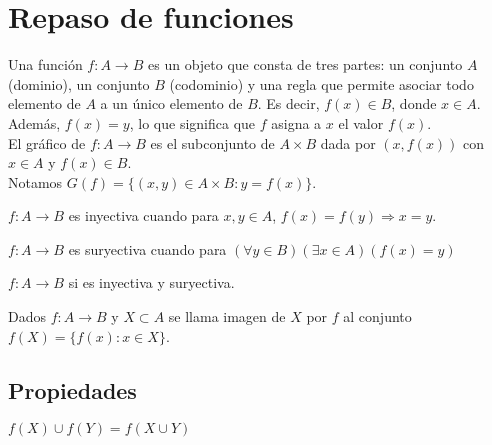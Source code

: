 \section{Repaso de funciones}

Una función $f: A \to B$ es un objeto que consta de tres partes: un conjunto $A$ (dominio), un conjunto $B$ (codominio) y una regla que permite asociar todo elemento de $A$ a un único elemento de $B$. Es decir, $f(x) \in B$, donde $x \in A$. Además, $f(x) = y$, lo que significa que $f$ asigna a $x$ el valor $f(x)$.\\

El gráfico de $f: A \to B$ es el subconjunto de $A \times B$ dada por $(x, f(x))$ con $x \in A$ y $f(x) \in B$.\\
Notamos $G(f) = \{ (x, y) \in A \times B : y = f(x) \}$.

\begin{definition}
    $f: A \to B$ es inyectiva cuando para $x, y \in A$, $f(x) = f(y) \Rightarrow x = y$.
\end{definition}

\begin{definition}
    $f: A \to B$ es suryectiva cuando para $(\forall y\in B)(\exists x\in A)(f(x) = y)$
\end{definition}

\begin{definition}
    $f: A \to B$ si es inyectiva y suryectiva.
\end{definition}

\begin{definition}
    Dados $f: A \to B$ y $X \subset A$ se llama imagen de $X$ por $f$ al conjunto $f(X) = \{f(x) : x \in X\}$.
\end{definition}

\subsection{Propiedades}

\begin{prop}
    $f(X) \cup f(Y) = f(X \cup Y)$
\end{prop}


